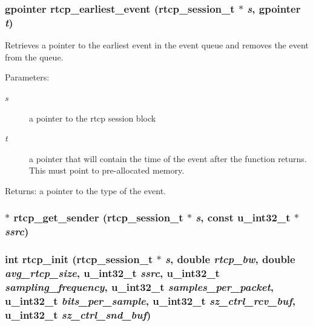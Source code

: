 \subsubsection{\setlength{\rightskip}{0pt plus 5cm}gpointer rtcp\_\-earliest\_\-event ({\bf rtcp\_\-session\_\-t} $\ast$ {\em s}, gpointer {\em t})}\label{rtcp_8c_a21}


Retrieves a pointer to the earliest event in the event queue and removes the event from the queue. \begin{Desc}
\item[Parameters:]
\begin{description}
\item[{\em s}]a pointer to the rtcp session block \item[{\em t}]a pointer that will contain the time of the event after the function returns. This must point to pre-allocated memory. \end{description}
\end{Desc}
\begin{Desc}
\item[Returns:]a pointer to the type of the event. \end{Desc}
\subsubsection{$\ast$ rtcp\_\-get\_\-sender ({\bf rtcp\_\-session\_\-t} $\ast$ {\em s}, const u\_\-int32\_\-t $\ast$ {\em ssrc})\hspace{0.3cm}{\tt  [static]}}\label{rtcp_8c_a10}


\subsubsection{\setlength{\rightskip}{0pt plus 5cm}int rtcp\_\-init ({\bf rtcp\_\-session\_\-t} $\ast$ {\em s}, double {\em rtcp\_\-bw}, double {\em avg\_\-rtcp\_\-size}, u\_\-int32\_\-t {\em ssrc}, u\_\-int32\_\-t {\em sampling\_\-frequency}, u\_\-int32\_\-t {\em samples\_\-per\_\-packet}, u\_\-int32\_\-t {\em bits\_\-per\_\-sample}, u\_\-int32\_\-t {\em sz\_\-ctrl\_\-rcv\_\-buf}, u\_\-int32\_\-t {\em sz\_\-ctrl\_\-snd\_\-buf})}\label{rtcp_8c_a0}



